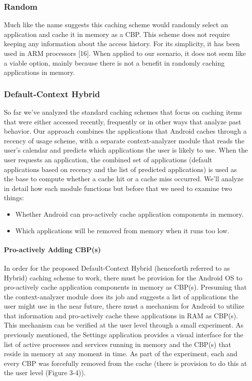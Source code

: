 \documentclass[12pt]{uthesis-v12}  %
\begin{document}
			\subsubsection{Random}
				Much like the name suggests this caching scheme would randomly select an application and cache it in memory as a CBP. This scheme does not require keeping any information about the access history. For its simplicity, it has been used in ARM processors [16]. When applied to our scenario, it does not seem like a viable option, mainly because there is not a benefit in randomly caching applications in memory.
				 
			\subsubsection{Default-Context Hybrid}
				So far we've analyzed the standard caching schemes that focus on caching items that were either accessed recently, frequently or in other ways that analyze past behavior. Our approach combines the applications that Android caches through a recency of usage scheme, with a separate context-analyzer module that reads the user's calendar and predicts which applications the user is likely to use. When the user requests an application, the combined set of applications (default applications based on recency and the list of predicted applications) is used as the base to compute whether a cache hit or a cache miss occurred. We'll analyze in detail how each module functions but before that we need to examine two things:
				
				\begin{itemize}
					\item Whether Android can pro-actively cache application components in memory.
					\item Which applications will be removed from memory when it runs too low.
				\end{itemize}
								
				\paragraph{Pro-actively Adding CBP(s)}
					In order for the proposed Default-Context Hybrid (henceforth referred to as Hybrid) caching scheme to work, there must be provision for the Android OS to pro-actively cache application components in memory as CBP(s). Presuming that the context-analyzer module does its job and suggests a list of applications the user might use in the near future, there must a mechanism for Android to utilize that information and pro-actively cache these applications in RAM as CBP(s). This mechanism can be verified at the user level through a small experiment. As previously mentioned, the Settings application provides a visual interface for the list of active processes and services running in memory and the CBP(s) that reside in memory at any moment in time. As part of the experiment, each and every CBP was forcefully removed from the cache (there is provision to do this at the user level (Figure 3-4)). 
						
\end{document}
